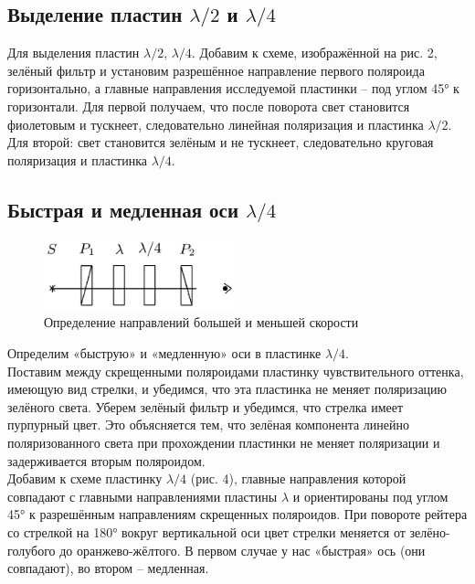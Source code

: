 \documentclass[a4paper,12pt]{article} %
\begin{document}
\subsection{Выделение пластин $ \lambda / 2 $ и $ \lambda / 4 $}
Для выделения пластин $ \lambda / 2 $, $ \lambda / 4 $. Добавим к схеме, изображённой на рис. 2, зелёный фильтр и установим разрешённое направление первого поляроида горизонтально, а главные направления исследуемой пластинки -- под углом 45° к горизонтали. Для первой получаем, что после поворота свет становится фиолетовым и тускнеет, следовательно линейная поляризация и пластинка $ \lambda / 2 $. Для второй: свет становится зелёным и не тускнеет, следовательно круговая поляризация и пластинка $ \lambda / 4 $.

\subsection{Быстрая и медленная оси $ \lambda / 4 $}
\begin{figure}
	\includegraphics[width=5.5cm]{Screenshot_4.png}
	\caption{Определение направлений большей и меньшей скорости}
	\label{pic:4}
\end{figure}
Определим «быструю» и «медленную» оси в пластинке $ \lambda / 4 $.
\\
Поставим между скрещенными поляроидами пластинку чувствительного оттенка, имеющую вид стрелки, и убедимся, что эта пластинка не меняет поляризацию зелёного света. Уберем зелёный фильтр и убедимся, что стрелка имеет пурпурный цвет. Это объясняется тем, что зелёная компонента линейно поляризованного света при прохождении пластинки не меняет поляризации и задерживается вторым поляроидом.
\\
Добавим к схеме пластинку $ \lambda / 4 $ (рис. 4), главные направления которой совпадают с главными направлениями пластины $ \lambda $ и ориентированы под углом 45° к разрешённым направлениям скрещенных поляроидов. При повороте рейтера со стрелкой на 180° вокруг вертикальной оси цвет стрелки меняется от зелёно-голубого до оранжево-жёлтого. В первом случае у нас «быстрая» ось (они совпадают), во втором -- медленная.
\end{document}
